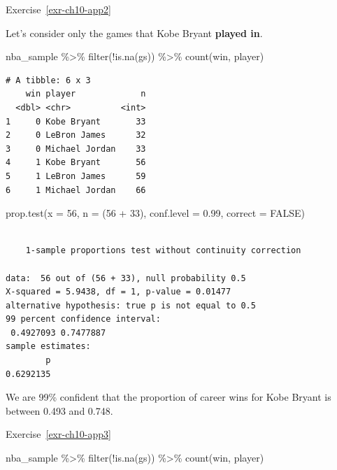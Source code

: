 \documentclass[
  letterpaper,
  DIV=11,
  numbers=noendperiod]{scrreprt}
\newenvironment{Shaded}{\begin{snugshade}}{\end{snugshade}}
\newcommand{\AttributeTok}[1]{\textcolor[rgb]{0.40,0.45,0.13}{#1}}
\newcommand{\ConstantTok}[1]{\textcolor[rgb]{0.56,0.35,0.01}{#1}}
\newcommand{\DecValTok}[1]{\textcolor[rgb]{0.68,0.00,0.00}{#1}}
\newcommand{\FloatTok}[1]{\textcolor[rgb]{0.68,0.00,0.00}{#1}}
\newcommand{\FunctionTok}[1]{\textcolor[rgb]{0.28,0.35,0.67}{#1}}
\newcommand{\NormalTok}[1]{\textcolor[rgb]{0.00,0.23,0.31}{#1}}
\newcommand{\SpecialCharTok}[1]{\textcolor[rgb]{0.37,0.37,0.37}{#1}}
\theoremstyle{definition}
\theoremstyle{remark}
\begin{document}
Exercise~\ref{exr-ch10-app2}

Let's consider only the games that Kobe Bryant \textbf{played in}.

\begin{Shaded}
\begin{Highlighting}[]
\NormalTok{nba\_sample }\SpecialCharTok{\%\textgreater{}\%} 
  \FunctionTok{filter}\NormalTok{(}\SpecialCharTok{!}\FunctionTok{is.na}\NormalTok{(gs)) }\SpecialCharTok{\%\textgreater{}\%} 
  \FunctionTok{count}\NormalTok{(win, player)}
\end{Highlighting}
\end{Shaded}

\begin{verbatim}
# A tibble: 6 x 3
    win player             n
  <dbl> <chr>          <int>
1     0 Kobe Bryant       33
2     0 LeBron James      32
3     0 Michael Jordan    33
4     1 Kobe Bryant       56
5     1 LeBron James      59
6     1 Michael Jordan    66
\end{verbatim}

\begin{Shaded}
\begin{Highlighting}[]
\FunctionTok{prop.test}\NormalTok{(}\AttributeTok{x =} \DecValTok{56}\NormalTok{, }\AttributeTok{n =}\NormalTok{ (}\DecValTok{56} \SpecialCharTok{+} \DecValTok{33}\NormalTok{), }\AttributeTok{conf.level =} \FloatTok{0.99}\NormalTok{, }\AttributeTok{correct =} \ConstantTok{FALSE}\NormalTok{)}
\end{Highlighting}
\end{Shaded}

\begin{verbatim}

    1-sample proportions test without continuity correction

data:  56 out of (56 + 33), null probability 0.5
X-squared = 5.9438, df = 1, p-value = 0.01477
alternative hypothesis: true p is not equal to 0.5
99 percent confidence interval:
 0.4927093 0.7477887
sample estimates:
        p 
0.6292135 
\end{verbatim}

We are 99\% confident that the proportion of career wins for Kobe Bryant
is between 0.493 and 0.748.

Exercise~\ref{exr-ch10-app3}

\begin{Shaded}
\begin{Highlighting}[]
\NormalTok{nba\_sample }\SpecialCharTok{\%\textgreater{}\%} 
  \FunctionTok{filter}\NormalTok{(}\SpecialCharTok{!}\FunctionTok{is.na}\NormalTok{(gs)) }\SpecialCharTok{\%\textgreater{}\%} 
  \FunctionTok{count}\NormalTok{(win, player)}
\end{Highlighting}
\end{Shaded}
\end{document}
